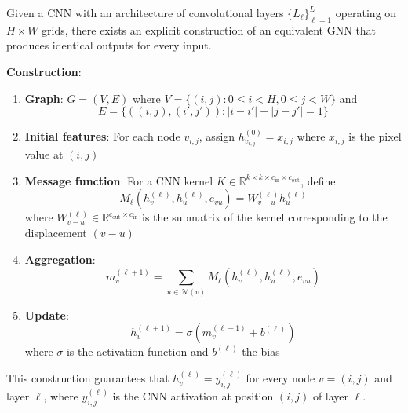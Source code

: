 \begin{theorem}\label{thm:equivalencia_constructiva_cnn_gnn}
Given a CNN with an architecture of convolutional layers $\{L_\ell\}_{\ell=1}^L$ operating on $H \times W$ grids, there exists an explicit construction of an equivalent GNN that produces identical outputs for every input.

\textbf{Construction}:
\begin{enumerate}
    \item \textbf{Graph}: $G = (V, E)$ where $V = \{(i,j) : 0 \leq i < H, 0 \leq j < W\}$ and
    \[
    E = \{((i,j), (i',j')) : |i-i'| + |j-j'| = 1\}
    \]

    \item \textbf{Initial features}: For each node $v_{i,j}$, assign $h_{v_{i,j}}^{(0)} = x_{i,j}$ where $x_{i,j}$ is the pixel value at $(i,j)$

    \item \textbf{Message function}: For a CNN kernel $K \in \mathbb{R}^{k \times k \times c_{\text{in}} \times c_{\text{out}}}$, define
    \[
    M_\ell(h_v^{(\ell)}, h_u^{(\ell)}, e_{vu}) = W_{v-u}^{(\ell)} h_u^{(\ell)}
    \]
    where $W_{v-u}^{(\ell)} \in \mathbb{R}^{c_{\text{out}} \times c_{\text{in}}}$ is the submatrix of the kernel corresponding to the displacement $(v-u)$

    \item \textbf{Aggregation}:
    \[
    m_v^{(\ell+1)} = \sum_{u \in \mathcal{N}(v)} M_\ell(h_v^{(\ell)}, h_u^{(\ell)}, e_{vu})
    \]

    \item \textbf{Update}:
    \[
    h_v^{(\ell+1)} = \sigma(m_v^{(\ell+1)} + b^{(\ell)})
    \]
    where $\sigma$ is the activation function and $b^{(\ell)}$ the bias
\end{enumerate}

This construction guarantees that $h_v^{(\ell)} = y_{i,j}^{(\ell)}$ for every node $v = (i,j)$ and layer $\ell$, where $y_{i,j}^{(\ell)}$ is the CNN activation at position $(i,j)$ of layer $\ell$.
\end{theorem}

